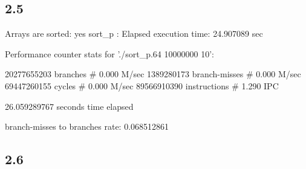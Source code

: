 \documentclass[12pt]{article}
\begin{document}
\subsection{2.5}

Arrays are sorted: yes
sort_p : Elapsed execution time: 24.907089 sec

 Performance counter stats for './sort_p.64 10000000 10':

    20277655203  branches                 #      0.000 M/sec
     1389280173  branch-misses            #      0.000 M/sec
    69447260155  cycles                   #      0.000 M/sec
    89566910390  instructions             #      1.290 IPC  

   26.059289767  seconds time elapsed

   branch-misses to branches rate: 0.068512861
\subsection{2.6}
\end{document}

